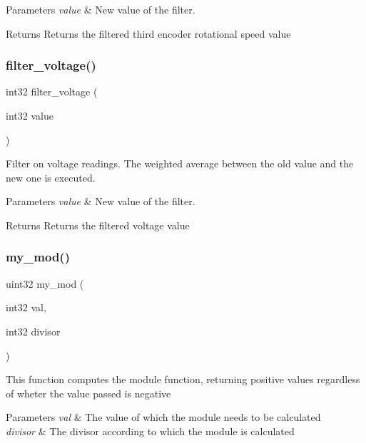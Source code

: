 \begin{DoxyParams}{Parameters}
{\em value} & New value of the filter.\\
\hline
\end{DoxyParams}
\begin{DoxyReturn}{Returns}
Returns the filtered third encoder rotational speed value 
\end{DoxyReturn}
\mbox{\label{utils_8h_a31121e24e34f0c17ecd9d048577dd710}} 
\subsubsection{filter\+\_\+voltage()}
{\footnotesize\ttfamily int32 filter\+\_\+voltage (\begin{DoxyParamCaption}\item[{int32}]{value }\end{DoxyParamCaption})}

Filter on voltage readings. The weighted average between the old value and the new one is executed.


\begin{DoxyParams}{Parameters}
{\em value} & New value of the filter.\\
\hline
\end{DoxyParams}
\begin{DoxyReturn}{Returns}
Returns the filtered voltage value 
\end{DoxyReturn}
\mbox{\label{utils_8h_a01d3bb6c1fd469a6c530fb296e4fe0fe}} 
\subsubsection{my\+\_\+mod()}
{\footnotesize\ttfamily uint32 my\+\_\+mod (\begin{DoxyParamCaption}\item[{int32}]{val,  }\item[{int32}]{divisor }\end{DoxyParamCaption})}

This function computes the module function, returning positive values regardless of wheter the value passed is negative


\begin{DoxyParams}{Parameters}
{\em val} & The value of which the module needs to be calculated \\
\hline
{\em divisor} & The divisor according to which the module is calculated \\
\hline
\end{DoxyParams}
\mbox{\label{utils_8h_a1ea4108a2c530470624ce2678e65dcef}} 
